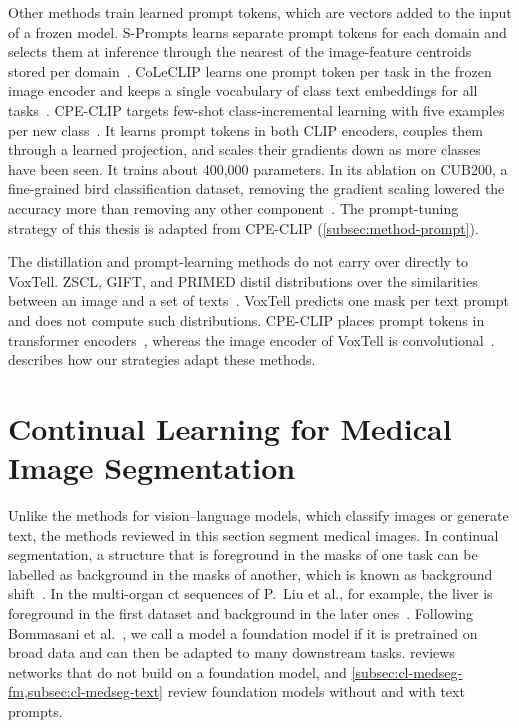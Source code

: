 Other methods train learned prompt tokens, which are vectors added to the input of a frozen model.
S-Prompts learns separate prompt tokens for each domain and selects them at inference through the nearest of the image-feature centroids stored per domain~\cite{wang2023spromptslearningpretrainedtransformers}.
CoLeCLIP learns one prompt token per task in the frozen image encoder and keeps a single vocabulary of class text embeddings for all tasks~\cite{li2024coleclipopendomaincontinuallearning}.
CPE-CLIP targets few-shot class-incremental learning with five examples per new class~\cite{D_Alessandro_2023}.
It learns prompt tokens in both CLIP encoders, couples them through a learned projection, and scales their gradients down as more classes have been seen.
It trains about 400{,}000 parameters.
In its ablation on CUB200, a fine-grained bird classification dataset, removing the gradient scaling lowered the accuracy more than removing any other component~\cite[Sec.~5.5, Fig.~2]{D_Alessandro_2023}.
The prompt-tuning strategy of this thesis is adapted from CPE-CLIP (\cref{subsec:method-prompt}).

The distillation and prompt-learning methods do not carry over directly to VoxTell.
ZSCL, GIFT, and PRIMED distil distributions over the similarities between an image and a set of texts~\cite{zheng2023preventingzeroshottransferdegradation,wu2024gift,chen2025forgingdynamicmemoryretrievalguided}.
VoxTell predicts one mask per text prompt and does not compute such distributions.
CPE-CLIP places prompt tokens in transformer encoders~\cite{D_Alessandro_2023}, whereas the image encoder of VoxTell is convolutional~\cite[Sec.~3]{rokuss2025voxtellfreetextpromptableuniversal}.
 describes how our strategies adapt these methods.

\section[Continual Learning for Medical Image Segmentation]{Continual Learning for Medical Image\texorpdfstring{\newline}{ } Segmentation}
\label{sec:cl-medseg}

Unlike the methods for vision--language models, which classify images or generate text, the methods reviewed in this section segment medical images.
In continual segmentation, a structure that is foreground in the masks of one task can be labelled as background in the masks of another, which is known as background shift~\cite{cermelli2020modelingbackgroundincrementallearning}.
In the multi-organ \gls{ct} sequences of P.~Liu et al., for example, the liver is foreground in the first dataset and background in the later ones~\cite{liu2022learningincrementallysegmentmultiple}.
Following Bommasani et al.~\cite[p.~3]{bommasani2021opportunities}, we call a model a foundation model if it is pretrained on broad data and can then be adapted to many downstream tasks.
 reviews networks that do not build on a foundation model, and \cref{subsec:cl-medseg-fm,subsec:cl-medseg-text} review foundation models without and with text prompts.

